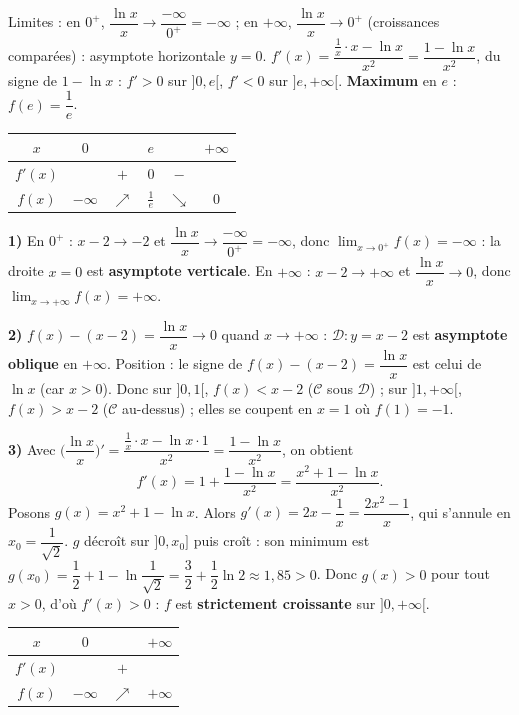 Limites : en $0^{+}$, $\dfrac{\ln x}{x}\to\dfrac{-\infty}{0^{+}}=-\infty$ ; en $+\infty$,
$\dfrac{\ln x}{x}\to0^{+}$ (croissances comparées) : asymptote horizontale $y=0$.
$f'(x)=\dfrac{\frac1x\cdot x-\ln x}{x^{2}}=\dfrac{1-\ln x}{x^{2}}$, du signe de $1-\ln x$ :
$f'>0$ sur $]0,e[$, $f'<0$ sur $]e,+\infty[$. \textbf{Maximum} en $e$ :
$f(e)=\dfrac1e$.
\begin{center}\small
\begin{tabular}{c|ccccc}
$x$ & $0$ & & $e$ & & $+\infty$\\
\hline
$f'(x)$ & & $+$ & $0$ & $-$ & \\
\hline
$f(x)$ & $-\infty$ & $\nearrow$ & $\tfrac1e$ & $\searrow$ & $0$\\
\end{tabular}
\end{center}

\textbf{1)} En $0^{+}$ : $x-2\to-2$ et $\dfrac{\ln x}{x}\to\dfrac{-\infty}{0^{+}}=-\infty$,
donc $\displaystyle\lim_{x\to0^{+}}f(x)=-\infty$ : la droite $x=0$ est \textbf{asymptote
verticale}. En $+\infty$ : $x-2\to+\infty$ et $\dfrac{\ln x}{x}\to0$, donc
$\displaystyle\lim_{x\to+\infty}f(x)=+\infty$.

\textbf{2)} $f(x)-(x-2)=\dfrac{\ln x}{x}\to0$ quand $x\to+\infty$ : $\mathcal D:y=x-2$ est
\textbf{asymptote oblique} en $+\infty$. Position : le signe de $f(x)-(x-2)=\dfrac{\ln x}{x}$
est celui de $\ln x$ (car $x>0$). Donc sur $]0,1[$, $f(x)<x-2$ ($\mathcal C$ sous
$\mathcal D$) ; sur $]1,+\infty[$, $f(x)>x-2$ ($\mathcal C$ au-dessus) ; elles se coupent en
$x=1$ où $f(1)=-1$.

\textbf{3)} Avec $\Big(\dfrac{\ln x}{x}\Big)'=\dfrac{\frac1x\cdot x-\ln x\cdot1}{x^{2}}
=\dfrac{1-\ln x}{x^{2}}$, on obtient
\[
f'(x)=1+\frac{1-\ln x}{x^{2}}=\frac{x^{2}+1-\ln x}{x^{2}}.
\]
Posons $g(x)=x^{2}+1-\ln x$. Alors $g'(x)=2x-\dfrac1x=\dfrac{2x^{2}-1}{x}$, qui s'annule en
$x_0=\dfrac1{\sqrt2}$. $g$ décroît sur $]0,x_0]$ puis croît : son minimum est
$g(x_0)=\dfrac12+1-\ln\dfrac1{\sqrt2}=\dfrac32+\dfrac12\ln2\approx1{,}85>0$. Donc $g(x)>0$
pour tout $x>0$, d'où $f'(x)>0$ : $f$ est \textbf{strictement croissante} sur $]0,+\infty[$.

\smallskip
\begin{center}\small
\begin{tabular}{c|ccc}
$x$ & $0$ & & $+\infty$\\
\hline
$f'(x)$ & & $+$ & \\
\hline
$f(x)$ & $-\infty$ & $\nearrow$ & $+\infty$\\
\end{tabular}
\end{center}

